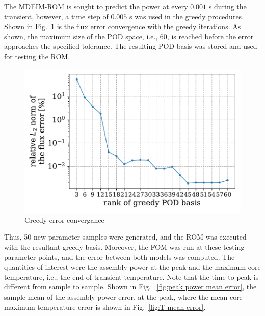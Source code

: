 \documentclass[]{interact}
\theoremstyle{plain}%
\theoremstyle{definition}
\theoremstyle{remark}
\begin{document}
The MDEIM-ROM is sought to predict the power at every $0.001$ s during the transient, however, a time step of $0.005$ s was used in the greedy procedures.
Shown in Fig.~\ref{fig:lra greedy error} is the flux error convergence with the greedy iterations.
As shown, the maximum size of the POD space, i.e., 60, is reached before the error approaches the specified tolerance.
The resulting POD basis was stored and used for testing the ROM.

\begin{figure}[H]
	\centering
	\includegraphics[width=0.9\linewidth]{../figures/greedy_convergance.pdf}
	\caption{Greedy error convergance}
	\label{fig:lra greedy error}
\end{figure}

Thus, 50 new parameter samples were generated, and the ROM was executed with the resultant greedy basis.
Moreover, the FOM was run at these testing parameter points, and the error between both models was computed.
The quantities of interest were the assembly power at the peak and the maximum core temperature, i.e., the end-of-transient temperature.
Note that the time to peak is different from sample to sample.
Shown in Fig.~ \ref{fig:peak power mean error}, the sample mean of the assembly power error, at the peak, where the mean core maximum temperature error is shown in Fig.~\ref{fig:T mean error}.
\end{document}
